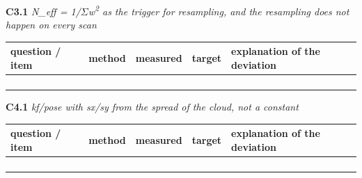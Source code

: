 \documentclass[a4paper,10pt]{article}
\begin{document}
\vspace{4pt}\noindent\textbf{C3.1} \emph{N\_eff = 1/\(\Sigma\)w\textsuperscript{2} as the trigger for resampling, and the resampling does not happen on every scan}

\begin{tabular}{|>{\raggedright\hyphenpenalty 500\arraybackslash}p{2.87cm}|>{\raggedright\hyphenpenalty 500\arraybackslash}p{2.28cm}|>{\raggedright\hyphenpenalty 500\arraybackslash}p{2.87cm}|>{\raggedright\hyphenpenalty 500\arraybackslash}p{2.28cm}|>{\raggedright\hyphenpenalty 500\arraybackslash}p{3.70cm}|}
\hline
\textbf{question / item} & \textbf{method} & \textbf{measured} & \textbf{target} & \textbf{explanation of the deviation} \\
\hline
\rule{0pt}{2.4em} & \rule{0pt}{2.4em} & \rule{0pt}{2.4em} & \rule{0pt}{2.4em} & \rule{0pt}{2.4em} \\
\rule{0pt}{2.4em} & \rule{0pt}{2.4em} & \rule{0pt}{2.4em} & \rule{0pt}{2.4em} & \rule{0pt}{2.4em} \\
\rule{0pt}{2.4em} & \rule{0pt}{2.4em} & \rule{0pt}{2.4em} & \rule{0pt}{2.4em} & \rule{0pt}{2.4em} \\
\rule{0pt}{2.4em} & \rule{0pt}{2.4em} & \rule{0pt}{2.4em} & \rule{0pt}{2.4em} & \rule{0pt}{2.4em} \\
\hline
\end{tabular}

\vspace{4pt}\noindent\textbf{C4.1} \emph{kf/pose with sx/sy from the spread of the cloud, not a constant}

\begin{tabular}{|>{\raggedright\hyphenpenalty 500\arraybackslash}p{2.87cm}|>{\raggedright\hyphenpenalty 500\arraybackslash}p{2.28cm}|>{\raggedright\hyphenpenalty 500\arraybackslash}p{2.87cm}|>{\raggedright\hyphenpenalty 500\arraybackslash}p{2.28cm}|>{\raggedright\hyphenpenalty 500\arraybackslash}p{3.70cm}|}
\hline
\textbf{question / item} & \textbf{method} & \textbf{measured} & \textbf{target} & \textbf{explanation of the deviation} \\
\hline
\rule{0pt}{2.4em} & \rule{0pt}{2.4em} & \rule{0pt}{2.4em} & \rule{0pt}{2.4em} & \rule{0pt}{2.4em} \\
\rule{0pt}{2.4em} & \rule{0pt}{2.4em} & \rule{0pt}{2.4em} & \rule{0pt}{2.4em} & \rule{0pt}{2.4em} \\
\rule{0pt}{2.4em} & \rule{0pt}{2.4em} & \rule{0pt}{2.4em} & \rule{0pt}{2.4em} & \rule{0pt}{2.4em} \\
\rule{0pt}{2.4em} & \rule{0pt}{2.4em} & \rule{0pt}{2.4em} & \rule{0pt}{2.4em} & \rule{0pt}{2.4em} \\
\hline
\end{tabular}
\end{document}
